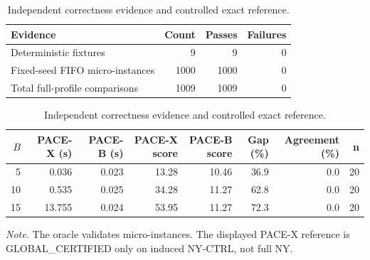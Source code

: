\begin{table}[t]
\centering
\caption{Independent correctness evidence and controlled exact reference.}
\begin{tabular}{lrrr}
\toprule
Evidence & Count & Passes & Failures \\
\midrule
Deterministic fixtures & 9 & 9 & 0 \\
Fixed-seed FIFO micro-instances & 1000 & 1000 & 0 \\
Total full-profile comparisons & 1009 & 1009 & 0 \\
\bottomrule
\end{tabular}
\vspace{2mm}
\begin{tabular}{rrrrrrrr}
\toprule
$B$ & PACE-X (s) & PACE-B (s) & PACE-X score & PACE-B score & Gap (\%) & Agreement (\%) & n \\
\midrule
5 & 0.036 & 0.023 & 13.28 & 10.46 & 36.9 & 0.0 & 20 \\
10 & 0.535 & 0.025 & 34.28 & 11.27 & 62.8 & 0.0 & 20 \\
15 & 13.755 & 0.024 & 53.95 & 11.27 & 72.3 & 0.0 & 20 \\
\bottomrule
\end{tabular}
\end{table}
\textit{Note.} The oracle validates micro-instances. The displayed PACE-X reference is GLOBAL\_CERTIFIED only on induced NY-CTRL, not full NY.
